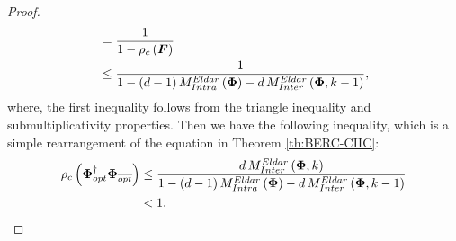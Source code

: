 \begin{proof}
\begin{gather*}
\begin{aligned}
 &= \frac{1}{1-\rho_c \left( \boldsymbol{F} \right)} \\
 &\leq \frac{1}{1-\left( d-1 \right) M^{Eldar}_{Intra}\left( \boldsymbol{\Phi} \right) - d \, M^{Eldar}_{Inter}\left( \boldsymbol{\Phi} , k-1 \right)},
\end{aligned}
\end{gather*}
where, the first inequality follows from the triangle inequality and submultiplicativity properties.
Then we have the following inequality, which is a simple rearrangement of the equation in Theorem \ref{th:BERC-CIIC}:
\begin{gather*}
\begin{aligned}
\rho_c \left( \boldsymbol{\Phi}_{opt}^\dagger \boldsymbol{\Phi}_{\overline{opt}} \right) &\leq \frac{d \, M^{Eldar}_{Inter}\left( \boldsymbol{\Phi} , k \right)}{1-\left( d-1 \right) M^{Eldar}_{Intra}\left( \boldsymbol{\Phi} \right) - d \, M^{Eldar}_{Inter}\left( \boldsymbol{\Phi} , k-1 \right)} \\
&< 1.
\end{aligned}
\end{gather*}
\end{proof}